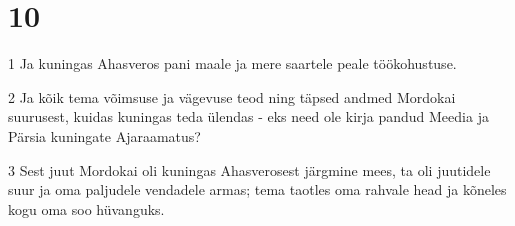 \chapter{10}

\par 1 Ja kuningas Ahasveros pani maale ja mere saartele peale töökohustuse.
\par 2 Ja kõik tema võimsuse ja vägevuse teod ning täpsed andmed Mordokai suurusest, kuidas kuningas teda ülendas - eks need ole kirja pandud Meedia ja Pärsia kuningate Ajaraamatus?
\par 3 Sest juut Mordokai oli kuningas Ahasverosest järgmine mees, ta oli juutidele suur ja oma paljudele vendadele armas; tema taotles oma rahvale head ja kõneles kogu oma soo hüvanguks.




